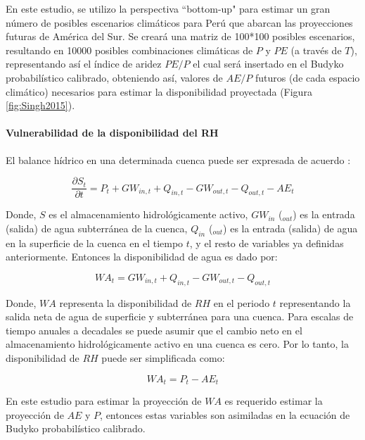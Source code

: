 \documentclass[12pt]{article}
\begin{document}
En este estudio, se utilizo la perspectiva “bottom-up" para estimar un gran número de posibles escenarios climáticos para Perú que abarcan las proyecciones futuras de América del Sur. Se creará una matriz de 100*100 posibles escenarios, resultando en 10000 posibles combinaciones climáticas de $P$ y $PE$ (a través de $T$), representando así el índice de aridez $PE/P$ el cual será insertado en el Budyko probabilístico calibrado, obteniendo así, valores de $AE/P$ futuros (de cada espacio climático) necesarios para estimar la disponibilidad proyectada (Figura \ref{fig:Singh2015}).

\paragraph{Vulnerabilidad de la disponibilidad del RH}\mbox{}

El balance hídrico en una determinada cuenca puede ser expresada de acuerdo \citep{Singh2015}:

\begin{equation}
\frac{\partial S_{t}}{\partial t} = P_{t} + GW_{in,t} + Q_{in,t} - GW_{out,t} - Q_{out,t} - AE_{t} 
\end{equation}

Donde, $S$ es el almacenamiento hidrológicamente activo, $GW_{in}$ ($_{out}$) es la entrada (salida) de agua subterránea de la cuenca, $Q_{in}$ ($_{out}$) es la entrada (salida) de agua en la superficie de la cuenca en el tiempo $t$, y el resto de variables ya definidas anteriormente. Entonces la disponibilidad de agua es dado por:

\begin{equation}
WA_{t} =  GW_{in,t} + Q_{in,t} - GW_{out,t} - Q_{out,t}
\end{equation}

Donde, $WA$ representa la disponibilidad de $RH$ en el periodo $t$ representando la salida neta de agua de superficie y subterránea para una cuenca. Para escalas de tiempo anuales a decadales se puede asumir que el cambio neto en el almacenamiento hidrológicamente activo en una cuenca es cero. Por lo tanto, la disponibilidad de $RH$ puede ser simplificada como: 

\begin{equation}
WA_{t} = P_{t} - AE_{t}
\end{equation}

En este estudio para estimar la proyección de $WA$ es requerido estimar la proyección de $AE$ y $P$, entonces estas variables son asimiladas en la ecuación de Budyko probabilístico calibrado.
\end{document}
